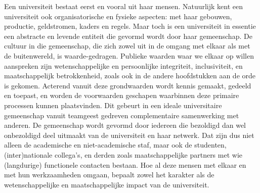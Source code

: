 \documentclass[smallauthor, chapterhaspagenum, nochapterinheader, pagenuminheader,  bigchapnum,medium2, tocpages, garamond, titleinheader]{jote-book}
\begin{document}
	Een universiteit bestaat eerst en vooral uit haar mensen. Natuurlijk kent een universiteit ook organisatorische en fysieke aspecten: met haar gebouwen, productie, geldstromen, kaders en regels. Maar toch is een universiteit in essentie een abstracte en levende entiteit die gevormd wordt door haar gemeenschap. De cultuur in die gemeenschap, die zich zowel uit in de omgang met elkaar als met de buitenwereld, is waarde-gedragen. Publieke waarden waar we elkaar op willen aanspreken zijn wetenschappelijke en persoonlijke integriteit, inclusiviteit, en maatschappelijk betrokkenheid, zoals ook in de andere hoofdstukken aan de orde is gekomen. Acterend vanuit deze grondwaarden wordt kennis gemaakt, gedeeld en toepast, en worden de voorwaarden geschapen waarbinnen deze primaire processen kunnen plaatsvinden. Dit gebeurt in een ideale universitaire gemeenschap vanuit teamgeest gedreven complementaire samenwerking met anderen. De gemeenschap wordt gevormd door iedereen die bezoldigd dan wel onbezoldigd deel uitmaakt van de universiteit en haar netwerk. Dat zijn dus niet alleen de academische en niet-academische staf, maar ook de studenten, (inter)nationale collega's, en derden zoals maatschappelijke partners met wie (langdurige) functionele contacten bestaan. Hoe al deze mensen met elkaar en met hun werkzaamheden omgaan, bepaalt zowel het karakter als de wetenschappelijke en maatschappelijke impact van de universiteit.
\end{document}
